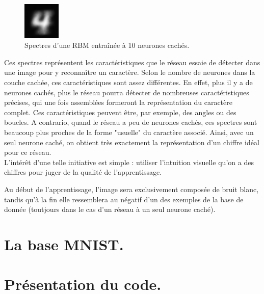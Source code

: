 \documentclass[a4paper,twoside]{report}
\begin{document}
                \begin{figure}
                    \begin{center}
                        \includegraphics[width=50pt]{Images/spectres-01.png}
                    \end{center}
                    \caption{Spectres d'une RBM entraînée à 10 neurones cachés.}
                \end{figure}

                Ces spectres représentent les caractéristiques que le réseau essaie de détecter dans une image pour y reconnaître un caractère. Selon le nombre de neurones dans la couche cachée, ces caractéristiques sont assez différentes. En effet, plus il y a de neurones cachés, plus le réseau pourra détecter de nombreuses caractéristiques précises, qui une fois assemblées formeront la représentation du caractère complet. Ces caractéristiques peuvent être, par exemple, des angles ou des boucles. A contrario, quand le réseau a peu de neurones cachés, ces spectres sont beaucoup plus proches de la forme "usuelle" du caractère associé. Ainsi, avec un seul neurone caché, on obtient très exactement la représentation d'un chiffre idéal pour ce réseau.\\

                L'intérêt d'une telle initiative est simple : utiliser l'intuition visuelle qu'on a des chiffres pour juger de la qualité de l'apprentissage.

                Au début de l'apprentissage, l'image sera exclusivement composée de bruit blanc, tandis qu'à la fin elle ressemblera au négatif d'un des exemples de la base de donnée (toutjours dans le cas d'un réseau à un seul neurone caché).


    \appendix

        \chapter{La base MNIST.}

        \chapter{Présentation du code.}
\end{document}

